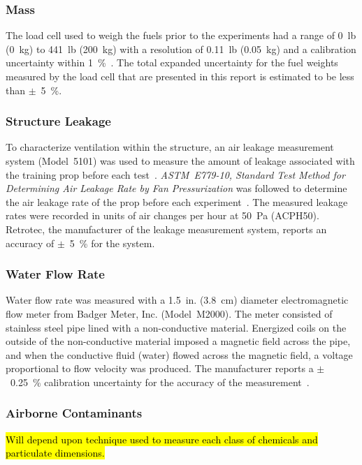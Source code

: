 \documentclass[12pt,oneside]{book}
\begin{document}
\subsubsection*{Mass}
The load cell used to weigh the fuels prior to the experiments had a range of 0~lb (0~kg) to 441~lb (200~kg) with a resolution of 0.11~lb (0.05~kg) and a calibration uncertainty within 1~\%~\cite{Ohaus:2000}. The total expanded uncertainty for the fuel weights measured by the load cell that are presented in this report is estimated to be less than $\pm$~5~\%.

\subsubsection*{Structure Leakage} 
To characterize ventilation within the structure, an air leakage measurement system (Model~5101) was used to measure the amount of leakage associated with the training prop before each test~\cite{retrotec:leakage}. \textit{ASTM~E779-10, Standard Test Method for Determining Air Leakage Rate by Fan Pressurization} was followed to determine the air leakage rate of the prop before each experiment~\cite{astm_e779}. The measured leakage rates were recorded in units of air changes per hour at 50~Pa (ACPH50). Retrotec, the manufacturer of the leakage measurement system, reports an accuracy of $\pm$~5~\% for the system.

\subsubsection*{Water Flow Rate}
Water flow rate was measured with a 1.5~in. (3.8~cm) diameter electromagnetic flow meter from Badger Meter, Inc. (Model~M2000). The meter consisted of stainless steel pipe lined with a non-conductive material. Energized coils on the outside of the non-conductive material imposed a magnetic field across the pipe, and when the conductive fluid (water) flowed across the magnetic field, a voltage proportional to flow velocity was produced. The manufacturer reports a $\pm$~0.25~\% calibration uncertainty for the accuracy of the measurement~\cite{Badger:2015}.

\subsubsection*{Airborne Contaminants}
\hl{Will depend upon technique used to measure each class of chemicals and particulate dimensions.} 
\end{document}
